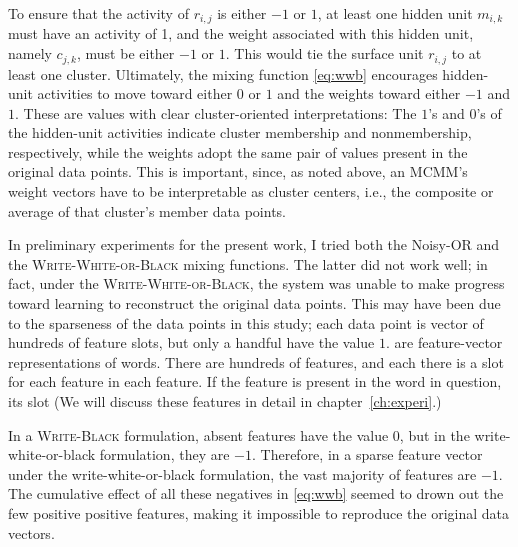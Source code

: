 To ensure that the activity of $r_{i,j}$ is either $-1$ or $1$, at least one hidden 
unit $m_{i,k}$ must have an activity of 1, and the weight associated with this 
hidden unit, namely $c_{j,k}$, must be either $-1$ or $1$. This would tie 
the surface unit $r_{i,j}$ to at least one cluster. Ultimately, the mixing 
function \eqref{eq:wwb} encourages hidden-unit activities to move  toward 
either $0$ or $1$ and the weights toward either $-1$ and $1$. These are 
values with clear cluster-oriented interpretations: The $1$'s and $0$'s of the 
hidden-unit activities indicate cluster membership and nonmembership, respectively, 
while the weights adopt the same pair of values present in the original data points. 
This is important, since, as noted above, an MCMM's weight vectors have to be 
interpretable as cluster centers, i.e., the composite or average of that cluster's 
member data points. %

In preliminary experiments for the present work, I tried both the Noisy-OR 
and the \textsc{Write-White-or-Black} mixing functions. The latter did 
not work well; in fact, under the \textsc{Write-White-or-Black}, the system 
was unable to make progress toward learning to reconstruct the original 
data points. This may have been due to the sparseness of the data points 
in this study; each data point is vector of hundreds of feature slots, but 
only a handful have the value $1$. are feature-vector representations of words. 
There are hundreds of features, and each there is a slot for each feature in each 
feature. If the feature is present in the word in question, its slot 
(We will discuss these features in detail in chapter~\ref{ch:experi}.)

In a \textsc{Write-Black} formulation, absent features have the value $0$, but in the write-white-or-black formulation, they are $-1$. Therefore, in a sparse feature vector under the write-white-or-black formulation, the vast majority of features are $-1$. The cumulative effect of all these negatives in \eqref{eq:wwb} seemed to drown out the few positive positive features, making it impossible to reproduce the original data vectors. 

